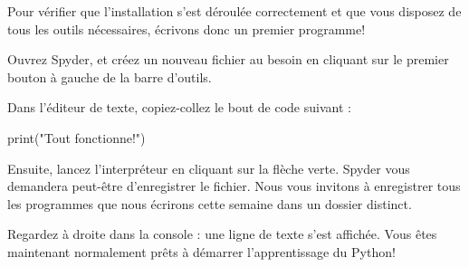 Pour vérifier que l'installation s'est déroulée correctement et que vous disposez de tous les outils nécessaires, écrivons donc un premier programme!

Ouvrez Spyder, et créez un nouveau fichier au besoin en cliquant sur le premier bouton à gauche de la barre d'outils.

Dans l'éditeur de texte, copiez-collez le bout de code suivant :

\begin{python}
print("Tout fonctionne!")
\end{python}

Ensuite, lancez l'interpréteur en cliquant sur la flèche verte. Spyder vous demandera peut-être d'enregistrer le fichier. Nous vous invitons à enregistrer tous les programmes que nous écrirons cette semaine dans un dossier distinct.

Regardez à droite dans la console : une ligne de texte s'est affichée. Vous êtes maintenant normalement prêts à démarrer l'apprentissage du Python!